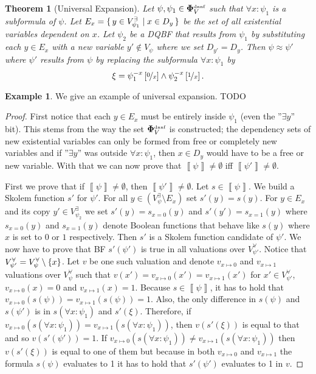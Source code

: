 \documentclass[
  digital, %
  twoside, %
  table,   %
  nolof,     %
  nolot,     %
]{fithesis3}
\let\setbuilder\set
\newcommand{\simpleset}[1]{\{{#1}\}}
\renewcommand{\set}[1]{\normalexpandarg\IfSubStr{#1}{|}{\setbuilder{#1}}{\simpleset{#1}}}
\newtheorem{theorem}{Theorem}[chapter] %
\theoremstyle{definition}
\newtheorem{example}{Example}
\theoremstyle{remark}
\newcommand{\seman}[1]{\left\llbracket {#1} \right\rrbracket}
\newcommand{\substitute}[2]{\left[ \nicefrac{#2}{#1} \right]}
\newcommand{\DQBF}[1]{\mathbf{\Phi}_{#1}^{\text{\tiny dnnf}}}
\newcommand{\evars}[1]{V_{#1}^{\exists}}
\newcommand{\uvars}[1]{V_{#1}^{\forall}}
\begin{document}
\begin{theorem}[Universal Expansion]
  Let $\psi, \psi_1 \in \DQBF{V}$ such that $\forall x : \psi_1$ is a subformula of $\psi$. Let $E_{x} = \set{y \in \evars{\psi_1} | x \in D_y}$ be the set of all existential variables dependent on $x$. Let $\psi_2$ be a DQBF that results from $\psi_1$ by substituting each $y \in E_x$ with a new variable $y' \not\in V_{\psi}$ where we set $D_{y'} = D_y$. Then $\psi \approx \psi'$ where $\psi'$ results from $\psi$ by replacing the subformula $\forall x : \psi_1$ by 
  \[\xi = \psi_1^{-x}\substitute{x}{0} \land \psi_2^{-x}\substitute{x}{1}.\]
\end{theorem}
\begin{example}
We give an example of universal expansion. TODO
\end{example}
\begin{proof}
  First notice that each $y \in E_x$ must be entirely inside $\psi_1$ (even the ''$\exists y$'' bit). This stems from the way the set $\DQBF{V}$ is constructed; the dependency sets of new existential variables can only be formed from free or completely new variables and if ''$\exists y$'' was outside $\forall x :\psi_1$, then $x \in D_y$ would have to be a free or new variable. With that we can now prove that $\seman{\psi} \not= \emptyset$ iff $\seman{\psi'} \not= \emptyset$.
  
  First we prove that if $\seman{\psi} \not= \emptyset$, then $\seman{\psi'} \not= \emptyset$. Let $s \in \seman{\psi}$. We build a Skolem function $s'$ for $\psi'$. For all $y \in (\evars{\psi} \setminus E_x)$ set $s'(y) = s(y)$. For $y \in E_x$ and its copy $y' \in \evars{\psi_2}$ we set $s'(y) = s_{x=0}(y)$ and $s'(y') = s_{x=1}(y)$ where $s_{x=0}(y)$ and $s_{x=1}(y)$ denote Boolean functions that behave like $s(y)$ where $x$ is set to $0$ or $1$ respectively. Then $s'$ is a Skolem function candidate of $\psi'$. We now have to prove that BF $s'(\psi')$ is true in all valuations over $\uvars{\psi'}$. Notice that $\uvars{\psi'} = \uvars{\psi} \setminus \set{x}$. Let $v$ be one such valuation and denote $v_{x\mapsto0}$ and $v_{x\mapsto1}$ valuations over $\uvars{\psi}$ such that $v(x') = v_{x\mapsto0}(x') = v_{x\mapsto1}(x')$ for $x' \in \uvars{\psi'}$, $v_{x\mapsto0}(x) = 0$ and $v_{x\mapsto1}(x) = 1$. Because $s \in \seman{\psi}$, it has to hold that $v_{x\mapsto0}(s(\psi)) = v_{x\mapsto1}(s(\psi)) = 1$. Also, the only difference in $s(\psi)$ and $s(\psi')$ is in $s(\forall x:\psi_1)$ and $s'(\xi)$. Therefore, if $v_{x\mapsto0}(s(\forall x:\psi_1)) = v_{x\mapsto1}(s(\forall x:\psi_1))$, then $v(s'(\xi))$ is equal to that and so $v(s'(\psi')) = 1$. If $v_{x\mapsto0}(s(\forall x:\psi_1)) \not= v_{x\mapsto1}(s(\forall x:\psi_1))$ then $v(s'(\xi))$ is equal to one of them but because in both $v_{x\mapsto0}$ and $v_{x\mapsto1}$ the formula $s(\psi)$ evaluates to 1 it has to hold that $s'(\psi')$ evaluates to 1 in $v$.
  

\end{proof}
\end{document}
